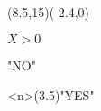 \begin{nagarezu}(8.5\zw,15\zh)(%
    2.4\zw,0\zh)%
  \sitahe
  \begin{handan}{\strut$X>0$}%
    \begin{sitabunki}%
  	  \sitahe"NO"%
    \end{sitabunki}%
    \begin{migibunki}%
      \migihe<n>(3.5\zw)"YES"
      \sitahe
      \sitahe
    \end{migibunki}%
  \end{handan}%
\end{nagarezu}%
